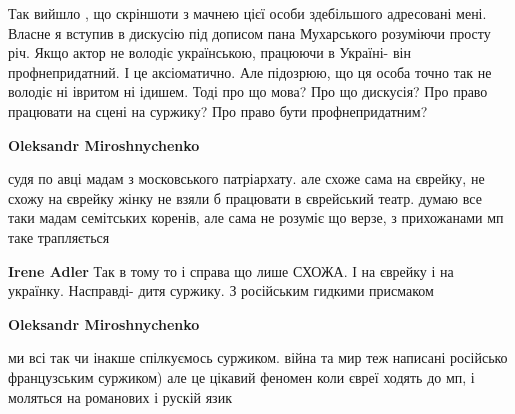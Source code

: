 \begin{itemize}
 

Так вийшло , що скріншоти з мачнею цієї особи здебільшого адресовані мені.
Власне я вступив в дискусію під дописом пана Мухарського розуміючи просту річ.
Якщо актор не володіє українською, працюючи в Україні- він профнепридатний. І
це аксіоматично. Але підозрюю, що ця особа точно так не володіє ні івритом ні
ідишем. Тоді про що мова? Про що дискусія? Про право працювати на сцені на
суржику? Про право бути профнепридатним?

\begin{itemize}
 
\textbf{Oleksandr Miroshnychenko} 

судя по авці мадам з московського патріархату. але схоже сама на єврейку, не
схожу на єврейку жінку не взяли б працювати в єврейський театр. думаю все таки
мадам семітських коренів, але сама не розуміє що верзе, з прихожанами мп таке
трапляється

\begin{itemize}
 
\textbf{Irene Adler} Так в тому то і справа що лише СХОЖА. І на єврейку і на українку. Насправді- дитя суржику. З російським гидкими присмаком

 
\textbf{Oleksandr Miroshnychenko} 

ми всі так чи інакше спілкуємось суржиком.
війна та мир теж написані російсько французським суржиком) але це цікавий
феномен коли євреї ходять до мп, і моляться на романових і рускій язик



\end{itemize}
\end{itemize}
\end{itemize}

